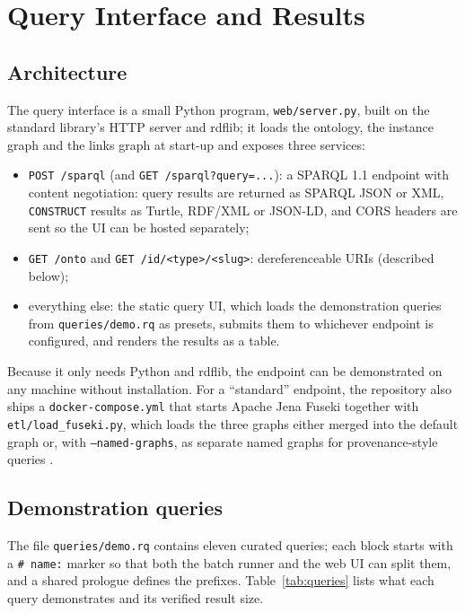 \section{Query Interface and Results}
\label{sec:query}

\subsection{Architecture}

The query interface is a small Python program, \texttt{web/server.py}, built on
the standard library's HTTP server and rdflib; it loads the ontology, the
instance graph and the links graph at start-up and exposes three services:

\begin{itemize}[itemsep=1pt]
  \item \texttt{POST /sparql} (and \texttt{GET /sparql?query=...}): a SPARQL
        1.1 endpoint with content negotiation: query results are returned as
        SPARQL JSON or XML, \texttt{CONSTRUCT} results as Turtle, RDF/XML or
        JSON-LD, and CORS headers are sent so the UI can be hosted separately;
  \item \texttt{GET /onto} and \texttt{GET /id/<type>/<slug>}:
        dereferenceable URIs (described below);
  \item everything else: the static query UI, which loads the demonstration
        queries from \texttt{queries/demo.rq} as presets, submits them to
        whichever endpoint is configured, and renders the results as a table.
\end{itemize}

Because it only needs Python and rdflib, the endpoint can be demonstrated on
any machine without installation. For a ``standard'' endpoint, the repository
also ships a \texttt{docker-compose.yml} that starts Apache Jena Fuseki
together with \texttt{etl/load\_fuseki.py}, which loads the three graphs either
merged into the default graph or, with \texttt{--named-graphs}, as separate
named graphs for provenance-style queries \cite{jena}.

\subsection{Demonstration queries}

The file \texttt{queries/demo.rq} contains eleven curated queries; each block
starts with a \texttt{\# name:} marker so that both the batch runner and the
web UI can split them, and a shared prologue defines the prefixes.
Table~\ref{tab:queries} lists what each query demonstrates and its verified
result size.

